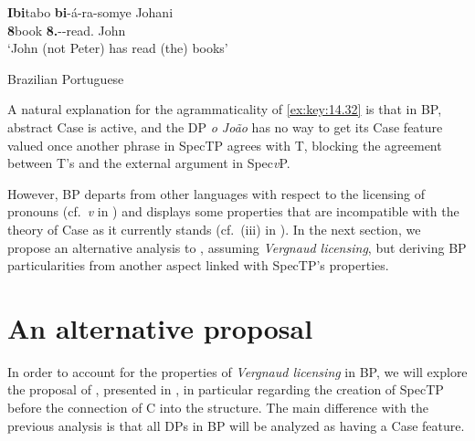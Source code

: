 \documentclass[output=paper]{langsci/langscibook}
\begin{document}
\ea%
    \label{ex:key:14.31} \parencite[723]{Carstens2011}
    \sn
    \gll    \textbf{Ibi}tabo \textbf{bi}-á-ra-somye Johani\\
            \textbf{8}book \textbf{8.\Sm}-\Pst{}-read.\Pfv{} John\\
    \glt    ‘John (not Peter) has read (the) books’
\z

\ea\label{ex:key:14.32}Brazilian Portuguese
\z

A natural explanation for the agrammaticality of \eqref{ex:key:14.32} is that
in \gls{BP}, abstract Case is active, and the DP \emph{o João} has no way to
get its Case feature valued once another phrase in SpecTP agrees with T,
blocking the agreement between T’s  and the external argument in
Spec\emph{v}P.

However, \gls{BP} departs from other  languages with respect to the
licensing of pronouns (cf.\ \emph{v} in ) and displays some
properties that are incompatible with the theory of Case as it currently stands
(cf.\ (iii) in ). In the next section, we propose an
alternative analysis to \textcite{AvelarGalves2011,AvelarGalves2016}, assuming
\emph{Vergnaud licensing}, but deriving \gls{BP} particularities from another
aspect linked with SpecTP’s properties.

\section{An alternative proposal}\label{sec:key:14.5}

In order to account for the properties of \emph{Vergnaud licensing} in
\gls{BP}, we will explore the proposal of
\textcite{AvelarGalves2011,AvelarGalves2016}, presented in
, in particular regarding the creation of SpecTP before
the connection of C into the structure. The main difference with the previous
analysis is that all DPs in \gls{BP} will be analyzed as having a Case
feature.
\end{document}
